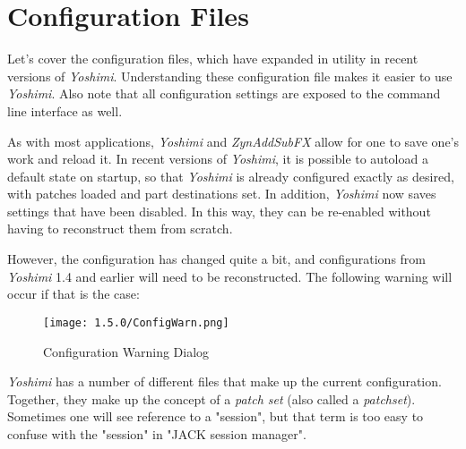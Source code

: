 %
%
%

\section{Configuration Files}
\label{sec:configuration}

   Let's cover the configuration files, which have expanded in utility in
   recent versions of \textsl{Yoshimi}.
   Understanding these configuration file makes it easier to 
   use \textsl{Yoshimi}.
   Also note that all configuration settings are exposed to the command line
   interface as well.

   As with most applications, \textsl{Yoshimi} and \textsl{ZynAddSubFX}
   allow for one to save one's work and reload it.
   In recent versions of \textsl{Yoshimi}, it is possible to autoload a default
   state on startup, so that \textsl{Yoshimi} is already configured exactly as
   desired, with patches loaded and part destinations set.
   In addition, \textsl{Yoshimi} now saves settings that have been disabled.
   In this way, they can be re-enabled without having to reconstruct them from
   scratch.

   However, the configuration has changed quite a bit, and configurations from
   \textsl{Yoshimi} 1.4 and earlier will need to be reconstructed.  The
   following warning will occur if that is the case:

\begin{figure}[H]
   \centering 
   \texttt{[image: 1.5.0/ConfigWarn.png]}
   \caption{Configuration Warning Dialog}
   \label{fig:config_warn_dialog}
\end{figure}

   \textsl{Yoshimi} has a number of different files that make up the current
   configuration.
   Together, they make up the concept of a \textsl{patch set} (also called a
   \textsl{patchset}).
   Sometimes one will see reference to a "session", but that term is too easy
   to confuse with the "session" in "JACK session manager".

